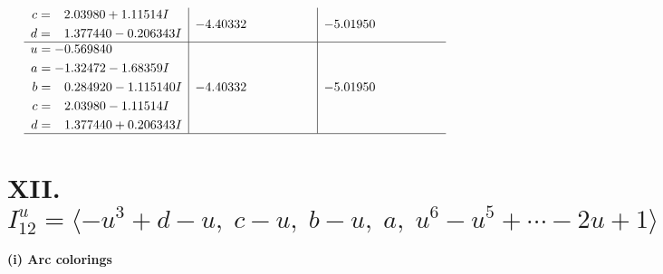 \documentclass[1p]{elsarticle_modified}
\theoremstyle{definition}
\begin{document}
$$\begin{array}{c|c|c}
\begin{aligned}
c &= \phantom{-}2.03980 + 1.11514 I \\
d &= \phantom{-}1.377440 - 0.206343 I\end{aligned}
 & -4.40332\phantom{ +0.000000I} & -5.01950\phantom{ +0.000000I} \\ \hline\begin{aligned}
u &= -0.569840\phantom{ +0.000000I} \\
a &= -1.32472 - 1.68359 I \\
b &= \phantom{-}0.284920 - 1.115140 I \\
c &= \phantom{-}2.03980 - 1.11514 I \\
d &= \phantom{-}1.377440 + 0.206343 I\end{aligned}
 & -4.40332\phantom{ +0.000000I} & -5.01950\phantom{ +0.000000I}\\
 \hline 
 \end{array}$$\newpage\newpage\renewcommand{\arraystretch}{1}
\centering \section*{XII. $I^u_{12}= \langle - u^3+d- u,\;c- u,\;b- u,\;a,\;u^6- u^5+\cdots-2 u+1 \rangle$}
\flushleft \textbf{(i) Arc colorings}\\
\end{document}
